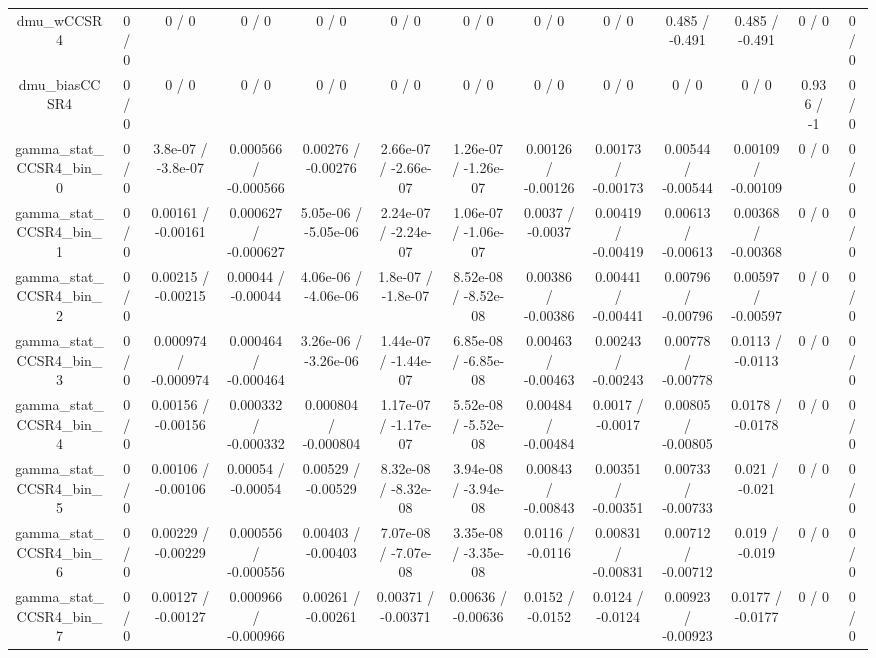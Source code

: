 \documentclass[10pt]{article}
\begin{document}
\begin{table}[htbp]
\begin{center}
\begin{tabular}{|c|c|c|c|c|c|c|c|c|c|c|c|c|}
  dmu_wCCSR4 & 0 / 0 & 0 / 0 & 0 / 0 & 0 / 0 & 0 / 0 & 0 / 0 & 0 / 0 & 0 / 0 & 0.485 / -0.491 & 0.485 / -0.491 & 0 / 0 & 0 / 0 \\ 
  dmu_biasCCSR4 & 0 / 0 & 0 / 0 & 0 / 0 & 0 / 0 & 0 / 0 & 0 / 0 & 0 / 0 & 0 / 0 & 0 / 0 & 0 / 0 & 0.936 / -1 & 0 / 0 \\ 
  gamma_stat_CCSR4_bin_0 & 0 / 0 & 3.8e-07 / -3.8e-07 & 0.000566 / -0.000566 & 0.00276 / -0.00276 & 2.66e-07 / -2.66e-07 & 1.26e-07 / -1.26e-07 & 0.00126 / -0.00126 & 0.00173 / -0.00173 & 0.00544 / -0.00544 & 0.00109 / -0.00109 & 0 / 0 & 0 / 0 \\ 
  gamma_stat_CCSR4_bin_1 & 0 / 0 & 0.00161 / -0.00161 & 0.000627 / -0.000627 & 5.05e-06 / -5.05e-06 & 2.24e-07 / -2.24e-07 & 1.06e-07 / -1.06e-07 & 0.0037 / -0.0037 & 0.00419 / -0.00419 & 0.00613 / -0.00613 & 0.00368 / -0.00368 & 0 / 0 & 0 / 0 \\ 
  gamma_stat_CCSR4_bin_2 & 0 / 0 & 0.00215 / -0.00215 & 0.00044 / -0.00044 & 4.06e-06 / -4.06e-06 & 1.8e-07 / -1.8e-07 & 8.52e-08 / -8.52e-08 & 0.00386 / -0.00386 & 0.00441 / -0.00441 & 0.00796 / -0.00796 & 0.00597 / -0.00597 & 0 / 0 & 0 / 0 \\ 
  gamma_stat_CCSR4_bin_3 & 0 / 0 & 0.000974 / -0.000974 & 0.000464 / -0.000464 & 3.26e-06 / -3.26e-06 & 1.44e-07 / -1.44e-07 & 6.85e-08 / -6.85e-08 & 0.00463 / -0.00463 & 0.00243 / -0.00243 & 0.00778 / -0.00778 & 0.0113 / -0.0113 & 0 / 0 & 0 / 0 \\ 
  gamma_stat_CCSR4_bin_4 & 0 / 0 & 0.00156 / -0.00156 & 0.000332 / -0.000332 & 0.000804 / -0.000804 & 1.17e-07 / -1.17e-07 & 5.52e-08 / -5.52e-08 & 0.00484 / -0.00484 & 0.0017 / -0.0017 & 0.00805 / -0.00805 & 0.0178 / -0.0178 & 0 / 0 & 0 / 0 \\ 
  gamma_stat_CCSR4_bin_5 & 0 / 0 & 0.00106 / -0.00106 & 0.00054 / -0.00054 & 0.00529 / -0.00529 & 8.32e-08 / -8.32e-08 & 3.94e-08 / -3.94e-08 & 0.00843 / -0.00843 & 0.00351 / -0.00351 & 0.00733 / -0.00733 & 0.021 / -0.021 & 0 / 0 & 0 / 0 \\ 
  gamma_stat_CCSR4_bin_6 & 0 / 0 & 0.00229 / -0.00229 & 0.000556 / -0.000556 & 0.00403 / -0.00403 & 7.07e-08 / -7.07e-08 & 3.35e-08 / -3.35e-08 & 0.0116 / -0.0116 & 0.00831 / -0.00831 & 0.00712 / -0.00712 & 0.019 / -0.019 & 0 / 0 & 0 / 0 \\ 
  gamma_stat_CCSR4_bin_7 & 0 / 0 & 0.00127 / -0.00127 & 0.000966 / -0.000966 & 0.00261 / -0.00261 & 0.00371 / -0.00371 & 0.00636 / -0.00636 & 0.0152 / -0.0152 & 0.0124 / -0.0124 & 0.00923 / -0.00923 & 0.0177 / -0.0177 & 0 / 0 & 0 / 0 \\ 

\end{tabular}
\end{center}
\end{table}
\end{document}
